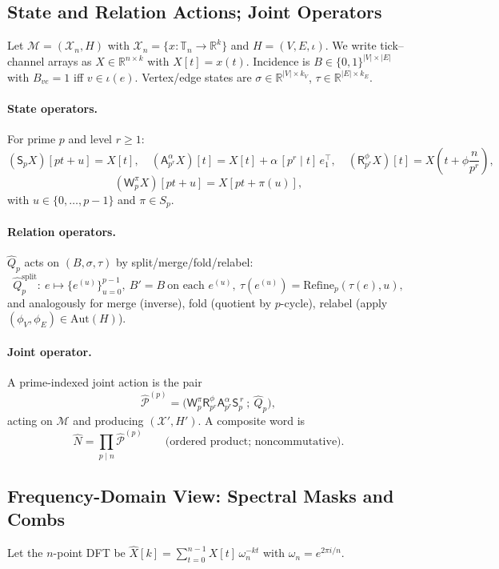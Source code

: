 \documentclass[12pt]{article}
\numberwithin{equation}{section}
\theoremstyle{plain}
\theoremstyle{definition}
\theoremstyle{remark}
\begin{document}
\subsection*{State and Relation Actions; Joint Operators}
Let $\mathcal{M}=(\mathcal{X}_n,H)$ with $\mathcal{X}_n=\{x:\mathbb{T}_n\to\mathbb{R}^k\}$ and $H=(V,E,\iota)$.
We write tick–channel arrays as $X\in\mathbb{R}^{n\times k}$ with $X[t]=x(t)$.
Incidence is $B\in\{0,1\}^{|V|\times |E|}$ with $B_{ve}=1$ iff $v\in\iota(e)$.
Vertex/edge states are $\sigma\in\mathbb{R}^{|V|\times k_V}$, $\tau\in\mathbb{R}^{|E|\times k_E}$.

\paragraph{State operators.}
For prime $p$ and level $r\ge 1$:
\[
(\mathsf{S}_p X)[pt+u]=X[t],\quad
(\mathsf{A}_{p^r}^{\alpha}X)[t]=X[t]+\alpha\,[p^r\mid t]\,e_1^\top,\quad
(\mathsf{R}_{p^r}^{\phi}X)[t]=X\!\left(t+\phi\frac{n}{p^r}\right),
\]
\[
(\mathsf{W}_p^{\pi}X)[pt+u]=X[pt+\pi(u)],
\]
with $u\in\{0,\dots,p-1\}$ and $\pi\in S_p$.

\paragraph{Relation operators.}
$\hat{Q}_p$ acts on $(B,\sigma,\tau)$ by split/merge/fold/relabel:
\[
\hat{Q}_p^{\mathrm{split}}:\ e\mapsto \{e^{(u)}\}_{u=0}^{p-1},\ 
B'\!=\!B\ \text{on each }e^{(u)},\ 
\tau(e^{(u)})=\mathrm{Refine}_p(\tau(e),u),
\]
and analogously for merge (inverse), fold (quotient by $p$-cycle), relabel (apply $(\phi_V,\phi_E)\in \mathrm{Aut}(H)$).

\paragraph{Joint operator.}
A prime-indexed joint action is the pair
\[
\widehat{\mathcal{P}}^{(p)}=\big(\mathsf{W}_p^{\pi}\mathsf{R}_{p^r}^{\phi}\mathsf{A}_{p^r}^{\alpha}\mathsf{S}_p^{\,r}\ ;\ \hat{Q}_p\big),
\]
acting on $\mathcal{M}$ and producing $(\mathcal{X}',H')$. A composite word is
\[
\widehat{N}=\prod_{p\mid n}\widehat{\mathcal{P}}^{(p)}\qquad\text{(ordered product; noncommutative).}
\]

\subsection*{Frequency-Domain View: Spectral Masks and Combs}
Let the $n$-point DFT be $\widehat{X}[k]=\sum_{t=0}^{n-1} X[t]\,\omega_n^{-kt}$ with $\omega_n=e^{2\pi i/n}$.
\end{document}
